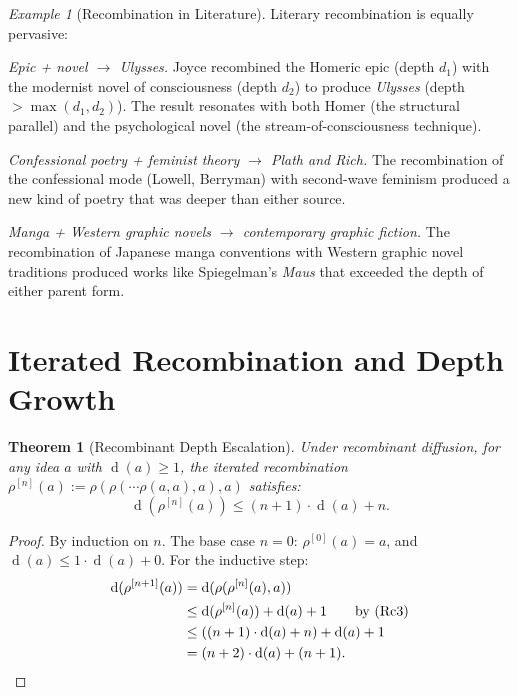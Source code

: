 \documentclass[11pt,openany]{book}
\theoremstyle{definition}
\theoremstyle{plain}
\newtheorem{theorem}[axiom]{Theorem}
\theoremstyle{remark}
\newtheorem{example}[axiom]{Example}
\newcommand{\depth}{\operatorname{d}}       %
\begin{document}
\begin{example}[Recombination in Literature]
Literary recombination is equally pervasive:

\emph{Epic + novel $\to$ \emph{Ulysses}.} Joyce recombined the Homeric epic (depth $d_1$) with the modernist novel of consciousness (depth $d_2$) to produce \emph{Ulysses} (depth $> \max(d_1, d_2)$). The result resonates with both Homer (the structural parallel) and the psychological novel (the stream-of-consciousness technique).

\emph{Confessional poetry + feminist theory $\to$ Plath and Rich.} The recombination of the confessional mode (Lowell, Berryman) with second-wave feminism produced a new kind of poetry that was deeper than either source.

\emph{Manga + Western graphic novels $\to$ contemporary graphic fiction.} The recombination of Japanese manga conventions with Western graphic novel traditions produced works like Spiegelman's \emph{Maus} that exceeded the depth of either parent form.
\end{example}

\section{Iterated Recombination and Depth Growth}

\begin{theorem}[Recombinant Depth Escalation]
Under recombinant diffusion, for any idea $a$ with $\depth(a) \geq 1$, the iterated recombination $\rho^{[n]}(a) := \rho(\rho(\cdots \rho(a, a), a), a)$ satisfies:
\[
\depth(\rho^{[n]}(a)) \leq (n+1) \cdot \depth(a) + n.
\]
\end{theorem}

\begin{proof}
By induction on $n$. The base case $n = 0$: $\rho^{[0]}(a) = a$, and $\depth(a) \leq 1 \cdot \depth(a) + 0$. For the inductive step:
\begin{align*}
\depth(\rho^{[n+1]}(a)) &= \depth(\rho(\rho^{[n]}(a), a)) \\
&\leq \depth(\rho^{[n]}(a)) + \depth(a) + 1 \qquad \text{by (Rc3)} \\
&\leq ((n+1) \cdot \depth(a) + n) + \depth(a) + 1 \\
&= (n+2) \cdot \depth(a) + (n+1). \qedhere
\end{align*}
\end{proof}
\end{document}
